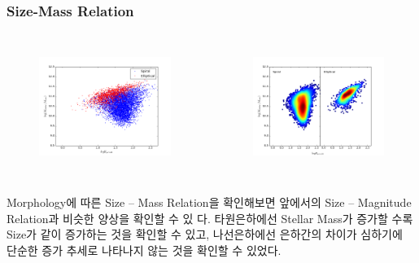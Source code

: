 \documentclass[xcolor={dvipsnames,table}]{beamer}
\newcommand\SSM{\fontsize{7}{7.2}\selectfont}
\begin{document}
\begin{frame}
 \frametitle{Size-Mass Relation}
 \SSM
 \begin{columns}[t]
   \begin{figure}
    \centering
    \includegraphics[width=6cm, height=4cm]{sizemass.png}
   \end{figure}
   \begin{figure}
    \centering
    \includegraphics[width=6cm, height=4cm]{sizemassdensity.png}
   \end{figure}
  \end{columns}
\vspace{0.3cm}
Morphology에 따른 Size – Mass Relation을 확인해보면 앞에서의 Size – Magnitude Relation과 비슷한 양상을 확인할 수 있
다. 타원은하에선 Stellar Mass가 증가할 수록 Size가 같이 증가하는 것을 확인할 수 있고, 나선은하에선 은하간의 차이가 심하기에
단순한 증가 추세로 나타나지 않는 것을 확인할 수 있었다.

\end{frame}
\end{document}
